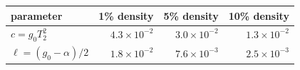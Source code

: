 \begin{tabular}{lrrr}
\toprule
parameter & 1\% density & 5\% density & 10\% density \\
\midrule
$c=g_0T_2^2$ & $4.3\times10^{-2}$ & $3.0\times10^{-2}$ & $1.3\times10^{-2}$ \\
$\ell=(g_0-\alpha)/2$ & $1.8\times10^{-2}$ & $7.6\times10^{-3}$ & $2.5\times10^{-3}$ \\
\bottomrule
\end{tabular}